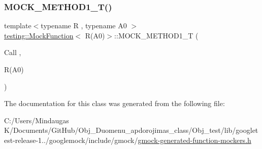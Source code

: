 \subsubsection{\texorpdfstring{MOCK\_METHOD1\_T()}{MOCK\_METHOD1\_T()}}
{\footnotesize\ttfamily template$<$typename R , typename A0 $>$ \\
\mbox{\hyperlink{classtesting_1_1_mock_function}{testing\+::\+Mock\+Function}}$<$ R(A0)$>$\+::M\+O\+C\+K\+\_\+\+M\+E\+T\+H\+O\+D1\+\_\+T (\begin{DoxyParamCaption}\item[{Call}]{,  }\item[{R(A0)}]{ }\end{DoxyParamCaption})}



The documentation for this class was generated from the following file\+:\begin{DoxyCompactItemize}
\item 
C\+:/\+Users/\+Mindaugas K/\+Documents/\+Git\+Hub/\+Obj\+\_\+\+Duomenu\+\_\+apdorojimas\+\_\+class/\+Obj\+\_\+test/lib/googletest-\/release-\/1../googlemock/include/gmock/\mbox{\hyperlink{_obj__test_2lib_2googletest-release-1_88_81_2googlemock_2include_2gmock_2gmock-generated-function-mockers_8h}{gmock-\/generated-\/function-\/mockers.\+h}}\end{DoxyCompactItemize}
